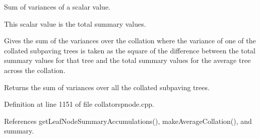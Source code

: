 \-Sum of variances of a scalar value. 

\-This scalar value is the total summary values.

\-Gives the sum of the variances over the collation where the variance of one of the collated subpaving trees is taken as the square of the difference between the total summary values for that tree and the total summary values for the average tree across the collation.

\begin{DoxyReturn}{\-Returns}
the sum of variances over all the collated subpaving trees. 
\end{DoxyReturn}


\-Definition at line 1151 of file collatorspnode.\-cpp.



\-References get\-Leaf\-Node\-Summary\-Accumulations(), make\-Average\-Collation(), and summary.



